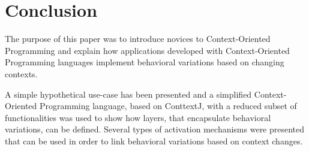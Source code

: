 \documentclass{acm_proc_article-sp}
\begin{document}
\section{Conclusion}
\label{sec:conclusion}
The purpose of this paper was to introduce novices to Context-Oriented Programming and explain how applications developed with Context-Oriented Programming languages implement behavioral variations based on changing contexts. 

A simple hypothetical use-case has been presented and a simplified Context-Oriented Programming language, based on ConttextJ, with a reduced subset of functionalities was used to show how layers, that encapsulate behavioral variations, can be defined. Several types of activation mechanisms were presented that can be used in order to link behavioral variations based on context changes. 



\end{document}
